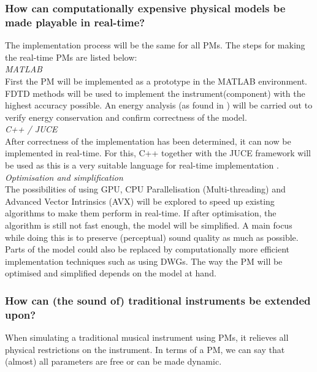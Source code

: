 \subsubsection*{How can computationally expensive physical models be made playable in real-time?}
The implementation process will be the same for all PMs. The steps for making the real-time PMs are listed below:
\\

\noindent\textit{MATLAB}
\vspace{0.15cm}
\\
\noindent First the PM will be implemented as a prototype in the MATLAB environment. FDTD methods will be used to implement the instrument(component) with the highest accuracy possible. An energy analysis (as found in \cite{Bilbao2009}) will be carried out to verify energy conservation and confirm correctness of the model.
\\

\noindent\textit{C++ / JUCE}
\vspace{0.15cm}
\\
\noindent 
After correctness of the implementation has been determined, it can now be implemented in real-time. For this, C++  together with the JUCE framework will be used as this is a very suitable language for real-time implementation \cite{Meyers2005, JUCE}.
\\

\noindent\textit{Optimisation and simplification}
\vspace{0.15cm}
\\
\noindent 
The possibilities of using GPU, CPU Parallelisation (Multi-threading) and Advanced Vector Intrinsics (AVX) will be explored to speed up existing algorithms to make them perform in real-time. If after optimisation, the algorithm is still not fast enough, the model will be simplified. A main focus while doing this is to preserve (perceptual) sound quality as much as possible. Parts of the model could also be replaced by computationally more efficient implementation techniques such as using DWGs. The way the PM will be optimised and simplified depends on the model at hand. 

\subsubsection*{How can (the sound of) traditional instruments be extended upon?}

When simulating a traditional musical instrument using PMs, it relieves all physical restrictions on the instrument. In terms of a PM, we can say that (almost) all parameters are free or can be made dynamic.

